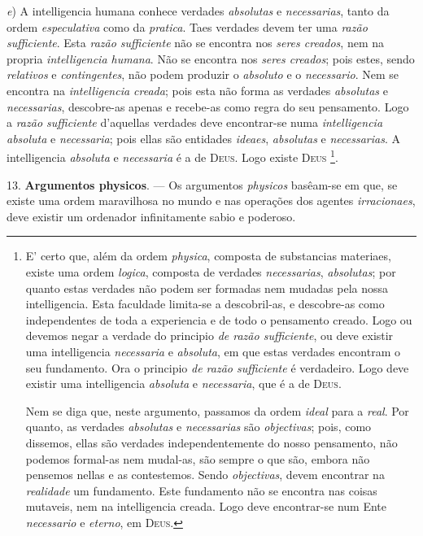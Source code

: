 \emph{e}) A intelligencia humana conhece verdades \emph{absolutas} e \emph{necessarias}, tanto da ordem \emph{especulativa} como da \emph{pratica}. Taes verdades devem ter uma \emph{razão sufficiente}. Esta \emph{razão sufficiente} não se encontra nos \emph{seres creados}, nem na propria \emph{intelligencia humana}. Não se encontra nos \emph{seres creados}; pois estes, sendo \emph{relativos} e \emph{contingentes}, não podem produzir o \emph{absoluto} e o  \emph{necessario}. Nem se encontra na \emph{intelligencia creada}; pois esta não forma as verdades \emph{absolutas} e \emph{necessarias}, descobre-as apenas e recebe-as como regra do seu pensamento. Logo a \emph{razão sufficiente} d'aquellas verdades deve encontrar-se numa \emph{intelligencia absoluta} e \emph{necessaria}; pois ellas são entidades \emph{ideaes}, \emph{absolutas} e \emph{necessarias}. A intelligencia \emph{absoluta} e \emph{necessaria} é a de \textsc{Deus}. Logo existe \textsc{Deus} \footnote{E' certo que, além da ordem \emph{physica}, composta de substancias materiaes, existe uma ordem \emph{logica}, composta de verdades \emph{necessarias}, \emph{absolutas}; por quanto estas verdades não podem ser formadas nem mudadas pela nossa intelligencia. Esta faculdade limita-se a descobril-as, e descobre-as como independentes de toda a experiencia e de todo o pensamento creado. Logo ou devemos negar a verdade do principio \emph{de razão sufficiente}, ou deve existir uma intelligencia \emph{necessaria} e \emph{absoluta}, em que estas verdades encontram o seu fundamento. Ora o principio \emph{de razão sufficiente} é verdadeiro. Logo deve existir uma intelligencia \emph{absoluta} e \emph{necessaria}, que é a de \textsc{Deus}.\par Nem se diga que, neste argumento, passamos da ordem \emph{ideal} para a \emph{real}. Por quanto, as verdades \emph{absolutas} e \emph{necessarias} são \emph{objectivas}; pois, como dissemos, ellas são verdades independentemente do nosso pensamento, não podemos formal-as nem mudal-as, são sempre o que são, embora não pensemos nellas e as contestemos. Sendo \emph{objectivas}, devem encontrar na \emph{realidade} um fundamento. Este fundamento não se encontra nas coisas mutaveis, nem na intelligencia creada. Logo deve encontrar-se num Ente \emph{necessario} e \emph{eterno}, em \textsc{Deus}.}.

13. \textbf{Argumentos physicos}. --- Os argumentos \emph{physicos} basêam-se em que, se existe uma ordem maravilhosa no mundo e nas operações dos agentes \emph{irracionaes}, deve existir um ordenador infinitamente sabio e poderoso.

